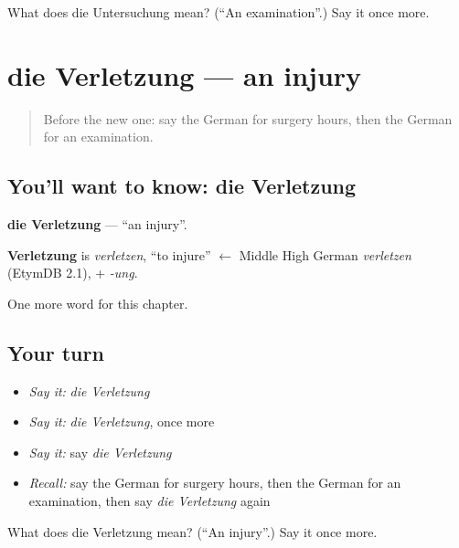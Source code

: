 \begin{tcolorbox}[breakable,colback=teal!4,colframe=teal!35!black,title={Before you move on}]
What does die Untersuchung mean? (\textquotedblleft{}An examination\textquotedblright{}.) Say it once more.
\end{tcolorbox}
\section[die Verletzung]{die Verletzung — an injury}

\label{lesson:GE-C205-verletzung}



\begin{quote}
Before the new one: say the German for surgery hours, then the German for an examination.
\end{quote}

\subsection*{You'll want to know: die Verletzung}
\textbf{die Verletzung} — \textquotedblleft{}an injury\textquotedblright{}.

\begin{cousinweb}
\textbf{Verletzung} is \emph{verletzen}, \textquotedblleft{}to injure\textquotedblright{} $\leftarrow$ Middle High German \emph{verletzen} (EtymDB 2.1), + \emph{-ung}.
\end{cousinweb}

\begin{grammarlens}[title={What you've built}]
One more word for this chapter.
\end{grammarlens}

\subsection*{Your turn}
\begin{itemize}
\raggedright
  \item \emph{Say it:} \emph{die Verletzung}
  \item \emph{Say it:} \emph{die Verletzung}, once more
  \item \emph{Say it:} say \emph{die Verletzung}
  \item \emph{Recall:} say the German for surgery hours, then the German for an examination, then say \emph{die Verletzung} again
\end{itemize}

\begin{tcolorbox}[breakable,colback=teal!4,colframe=teal!35!black,title={Before you move on}]
What does die Verletzung mean? (\textquotedblleft{}An injury\textquotedblright{}.) Say it once more.
\end{tcolorbox}
